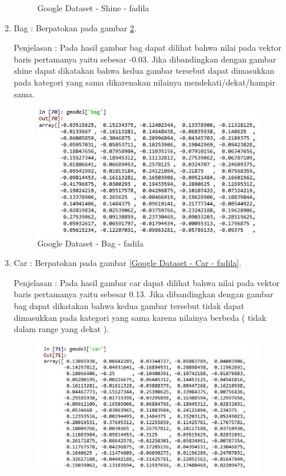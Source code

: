 \begin{enumerate}
\begin{enumerate}
\begin{figure}[!hbtp]
\caption{Google Dataset - Shine - fadila}
\label{Google Dataset - Shine - fadila}
\end{figure}
\par
\item Bag :  Berpatokan pada gambar \ref{Google Dataset - Bag - fadila}.
\par Penjelasan : Pada hasil gambar bag dapat dilihat bahwa nilai pada vektor baris pertamanya yaitu sebesar -0.03. Jika dibandingkan dengan gambar shine dapat dikatakan bahwa kedua gambar tersebut dapat dimasukkan pada kategori yang sama dikarenakan nilainya mendekati/dekat/hampir sama.
\par
\begin{figure}[!hbtp]
\centering
\includegraphics[scale=0.3]{figures/1-bag-fadila.jpg}
\caption{Google Dataset - Bag - fadila}
\label{Google Dataset - Bag - fadila}
\end{figure}
\par
\item Car :  Berpatokan pada gambar \ref{Google Dataset - Car - fadila}.
\par Penjelasan : Pada hasil gambar car dapat dilihat bahwa nilai pada vektor baris pertamanya yaitu sebesar 0.13. Jika dibandingkan dengan gambar bag dapat dikatakan bahwa kedua gambar tersebut tidak dapat dimasukkan pada kategori yang sama karena nilainya berbeda ( tidak dalam range yang dekat ).
\par
\begin{figure}[!hbtp]
\centering
\includegraphics[scale=0.3]{figures/1-car-fadila.jpg}

\end{figure}
\end{enumerate}
\end{enumerate}
